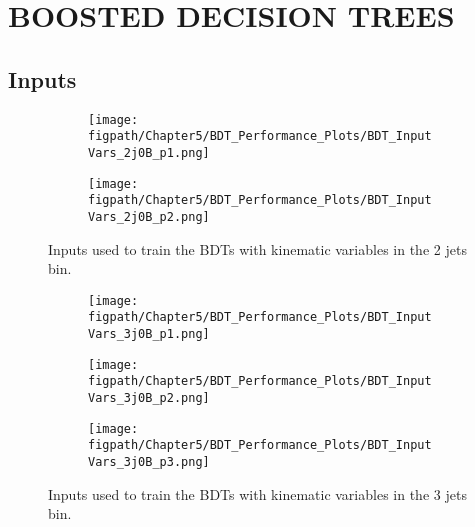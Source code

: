 %
%
%
%


\chapter{\texorpdfstring{\uppercase{Boosted Decision Trees}}{Boosted Decision Trees}}

\section{Inputs}
\label{appendix:BDT_Inputs}

\begin{figure}[!hbt]
    \centering
    \begin{subfigure}[t]{0.95\textwidth}
        \texttt{[image: \\figpath/Chapter5/BDT\_Performance\_Plots/BDT\_InputVars\_2j0B\_p1.png]}
        \caption{}
        \label{fig:BDT_InputVars_2j0B_p1}
    \end{subfigure}

    \begin{subfigure}[t]{0.95\textwidth}
        \texttt{[image: \\figpath/Chapter5/BDT\_Performance\_Plots/BDT\_InputVars\_2j0B\_p2.png]}
        \caption{}
        \label{fig:BDT_InputVars_2j0B_p2}
    \end{subfigure}
    \caption{Inputs used to train the BDTs with kinematic variables in the 2 jets bin.}
    \label{fig:BDT_InputVars_2j0B}
\end{figure}

\begin{figure}[!hbt]
    \centering
    \begin{subfigure}[t]{0.95\textwidth}
        \texttt{[image: \\figpath/Chapter5/BDT\_Performance\_Plots/BDT\_InputVars\_3j0B\_p1.png]}
        \caption{}
        \label{fig:BDT_InputVars_3j0B_p1}
    \end{subfigure}

    \begin{subfigure}[t]{0.95\textwidth}
        \texttt{[image: \\figpath/Chapter5/BDT\_Performance\_Plots/BDT\_InputVars\_3j0B\_p2.png]}
        \caption{}
        \label{fig:BDT_InputVars_3j0B_p2}
    \end{subfigure}

    \begin{subfigure}[t]{0.95\textwidth}
        \texttt{[image: \\figpath/Chapter5/BDT\_Performance\_Plots/BDT\_InputVars\_3j0B\_p3.png]}
        \caption{}
        \label{fig:BDT_InputVars_3j0B_p3}
    \end{subfigure}
    \caption{Inputs used to train the BDTs with kinematic variables in the 3 jets bin.}
    \label{fig:BDT_InputVars_3j0B}
\end{figure}

